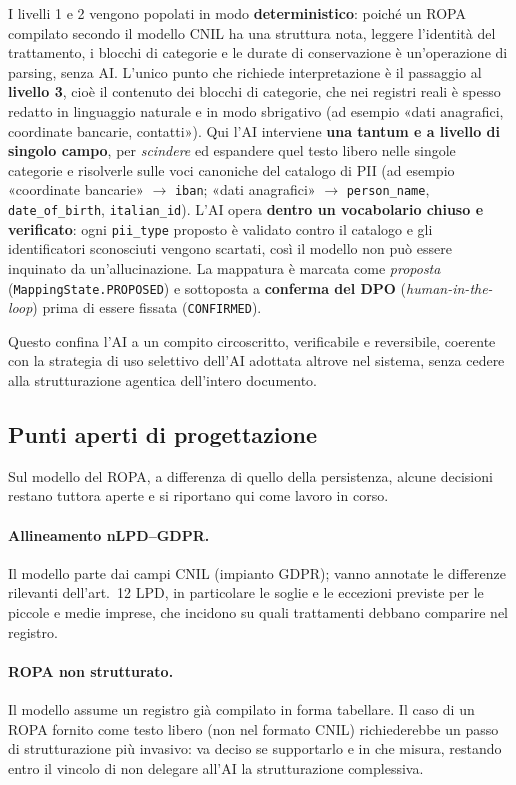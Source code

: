 I livelli 1 e 2 vengono popolati in modo \textbf{deterministico}: poiché un ROPA compilato secondo il modello CNIL ha una struttura nota, leggere l'identità del trattamento, i blocchi di categorie e le durate di conservazione è un'operazione di parsing, senza AI. L'unico punto che richiede interpretazione è il passaggio al \textbf{livello 3}, cioè il contenuto dei blocchi di categorie, che nei registri reali è spesso redatto in linguaggio naturale e in modo sbrigativo (ad esempio «dati anagrafici, coordinate bancarie, contatti»). Qui l'AI interviene \textbf{una tantum e a livello di singolo campo}, per \textit{scindere} ed espandere quel testo libero nelle singole categorie e risolverle sulle voci canoniche del catalogo di PII (ad esempio «coordinate bancarie» $\rightarrow$ \texttt{iban}; «dati anagrafici» $\rightarrow$ \texttt{person\_name}, \texttt{date\_of\_birth}, \texttt{italian\_id}). L'AI opera \textbf{dentro un vocabolario chiuso e verificato}: ogni \texttt{pii\_type} proposto è validato contro il catalogo e gli identificatori sconosciuti vengono scartati, così il modello non può essere inquinato da un'allucinazione. La mappatura è marcata come \textit{proposta} (\texttt{MappingState.PROPOSED}) e sottoposta a \textbf{conferma del DPO} (\textit{human-in-the-loop}) prima di essere fissata (\texttt{CONFIRMED}).

Questo confina l'AI a un compito circoscritto, verificabile e reversibile, coerente con la strategia di uso selettivo dell'AI adottata altrove nel sistema, senza cedere alla strutturazione agentica dell'intero documento.

\subsection{Punti aperti di progettazione}
\label{sub:ropa-punti-aperti}

Sul modello del ROPA, a differenza di quello della persistenza, alcune decisioni restano tuttora aperte e si riportano qui come lavoro in corso.

\paragraph{Allineamento nLPD--GDPR.} Il modello parte dai campi CNIL (impianto GDPR); vanno annotate le differenze rilevanti dell'art.~12 LPD, in particolare le soglie e le eccezioni previste per le piccole e medie imprese, che incidono su quali trattamenti debbano comparire nel registro.

\paragraph{ROPA non strutturato.} Il modello assume un registro già compilato in forma tabellare. Il caso di un ROPA fornito come testo libero (non nel formato CNIL) richiederebbe un passo di strutturazione più invasivo: va deciso se supportarlo e in che misura, restando entro il vincolo di non delegare all'AI la strutturazione complessiva.

